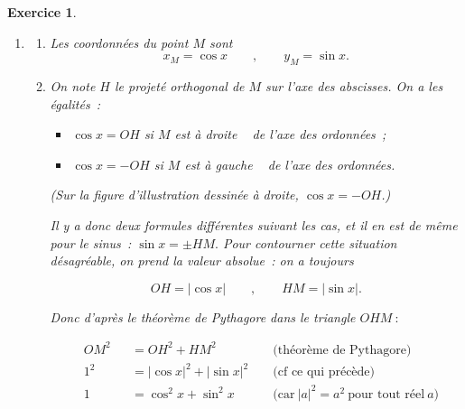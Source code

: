 \documentclass[10pt]{article}
\newtheorem{exo}{Exercice}
\begin{document}
\begin{exo}\label{AB}


\begin{enumerate}
\item \begin{multicols}{2}

\begin{enumerate}
\item  Les coordonnées du point $M$ sont
\[x_M=\cos x\qquad,\qquad y_M=\sin x.\]

\item On note $H$ le projeté orthogonal de $M$ sur l'axe des abscisses. On a les égalités~:
\begin{itemize}
\item[\textbullet] $\cos x=OH$ si $M$ est \og à droite \fg~{} de l'axe des ordonnées~;
\item[\textbullet] $\cos x=-OH$ si $M$ est \og à gauche \fg~{} de l'axe des ordonnées.
\end{itemize}
(Sur la figure d'illustration dessinée à droite, $\cos x=-OH$.)

\medskip

Il y a donc deux formules différentes suivant les cas, et il en est de même pour le sinus~: $\sin x=\pm HM.$ Pour contourner cette situation désagréable, on prend la valeur absolue~: on a toujours

\[OH=|\cos x|\qquad,\qquad HM=|\sin x|.\]

Donc d'après le théorème de Pythagore dans le triangle $OHM~:$


\begin{alignat*}{3}
&OM^2&& =OH^2+HM^2 && \text{  (théorème de Pythagore)}\\
&1^2 && =|\cos x|^2+|\sin x|^2 && \text{  (cf ce qui précède})\\
&1 && =\cos^2 x+\sin^2 x && \text{  (car}~|a|^2=a^2~\text{pour tout réel}~a)\\
\end{alignat*}


\end{enumerate}
\end{multicols}
\end{enumerate}
\end{exo}
\end{document}
